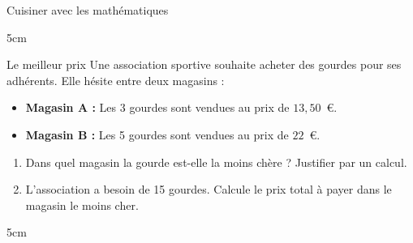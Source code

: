 \documentclass[a4paper]{book}
\begin{document}
{\begin{exerciceTitre}{Cuisiner avec les mathématiques}
        \begin{ZoneReponse}{5cm}
        \end{ZoneReponse}
    \end{exerciceTitre}


    \begin{exerciceTitre}{Le meilleur prix}
        Une association sportive souhaite acheter des gourdes pour ses adhérents. Elle hésite entre deux magasins :
        \begin{itemize}
            \item \textbf{Magasin A :} Les 3 gourdes sont vendues au prix de $13,50$~\euro.
            \item \textbf{Magasin B :} Les 5 gourdes sont vendues au prix de $22$~\euro.
        \end{itemize}
        \begin{enumerate}
            \item Dans quel magasin la gourde est-elle la moins chère ? Justifier par un calcul.
            \item L'association a besoin de 15 gourdes. Calcule le prix total à payer dans le magasin le moins cher.
        \end{enumerate}
    
        \begin{ZoneReponse}{5cm}
        \end{ZoneReponse}
    \end{exerciceTitre}

}  
\end{document}

